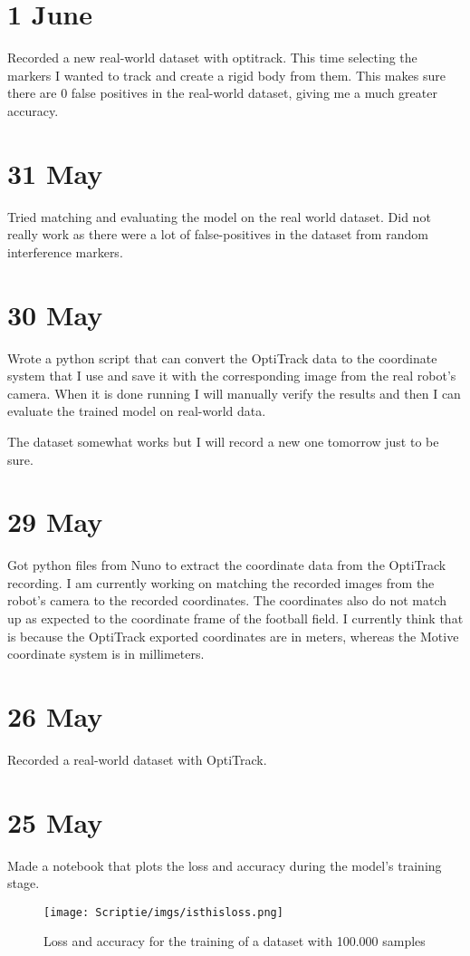 \documentclass[twoside]{report}
\begin{document}
\section*{1 June}
Recorded a new real-world dataset with optitrack. This time selecting the markers I wanted to track and create a rigid body from them. This makes sure there are 0 false positives in the real-world dataset, giving me a much greater accuracy.

\section*{31 May}
Tried matching and evaluating the model on the real world dataset. Did not really work as there were a lot of false-positives in the dataset from random interference markers. 

\section*{30 May}
Wrote a python script that can convert the OptiTrack data to the coordinate system that I use and save it with the corresponding image from the real robot's camera. When it is done running I will manually verify the results and then I can evaluate the trained model on real-world data.

The dataset somewhat works but I will record a new one tomorrow just to be sure.

\section*{29 May}
Got python files from Nuno to extract the coordinate data from the OptiTrack recording. I am currently working on matching the recorded images from the robot's camera to the recorded coordinates.
The coordinates also do not match up as expected to the coordinate frame of the football field. I currently think that is because the OptiTrack exported coordinates are in meters, whereas the Motive coordinate system is in millimeters. 

\section*{26 May}
Recorded a real-world dataset with OptiTrack.

\section*{25 May}
Made a notebook that plots the loss and accuracy during the model's training stage. 
\begin{figure}[!h]
\begin{centering}
\texttt{[image: Scriptie/imgs/isthisloss.png]}
\caption{Loss and accuracy for the training of a dataset with 100.000 samples}
\end{centering}
\end{figure}
\end{document}
